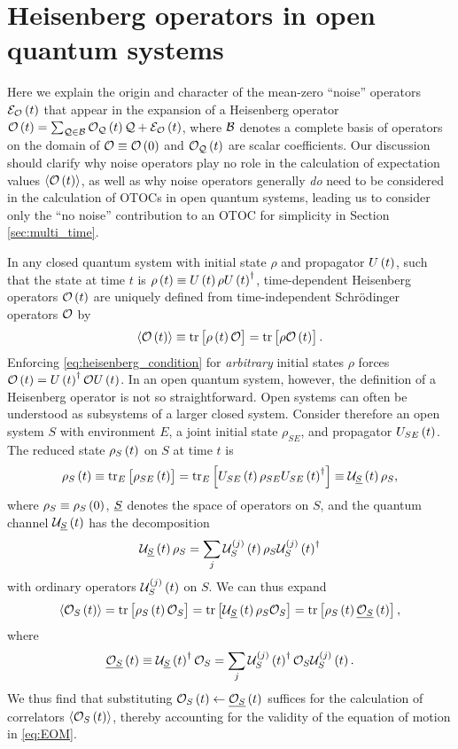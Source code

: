 \section{Heisenberg operators in open quantum systems}
\label{sec:noise}

Here we explain the origin and character of the mean-zero ``noise''
operators $\mathcal{E}_{\mathcal{O}}\left( t \right)$ that appear in the expansion of a Heisenberg
operator $\mathcal{O}\left( t \right)=\sum_{\mathcal{Q}\in\mathcal{B}}\mathcal{O}_{\mathcal{Q}}\left( t \right)\mathcal{Q}+\mathcal{E}_{\mathcal{O}}\left( t \right)$, where $\mathcal{B}$
denotes a complete basis of operators on the domain of
$\mathcal{O}\equiv\mathcal{O}\left( 0 \right)$ and $\mathcal{O}_{\mathcal{Q}}\left( t \right)$ are scalar coefficients.  Our
discussion should clarify why noise operators play no role in the
calculation of expectation values $\braket{\mathcal{O}\left( t \right)}$, as well as why noise
operators generally {\it do} need to be considered in the calculation
of OTOCs in open quantum systems, leading us to consider only the ``no
noise'' contribution to an OTOC for simplicity in Section
\ref{sec:multi_time}.

In any closed quantum system with initial state $\rho$ and propagator
$U\left( t \right)$, such that the state at time $t$ is
$\rho\left( t \right)\equiv U\left( t \right)\rho U\left( t \right)^\dag$, time-dependent Heisenberg
operators $\mathcal{O}\left( t \right)$ are uniquely defined from time-independent
Schr\"odinger operators $\mathcal{O}$ by
\begin{align}
  \braket{\mathcal{O}\left( t \right)} \equiv \tr\left[ \rho\left( t \right)\mathcal{O} \right] = \tr\left[ \rho\mathcal{O}\left( t \right) \right].
  \label{eq:heisenberg_condition}
\end{align}
Enforcing \eqref{eq:heisenberg_condition} for {\it arbitrary} initial
states $\rho$ forces $\mathcal{O}\left( t \right)=U\left( t \right)^\dag\mathcal{O} U\left( t \right)$.  In an open
quantum system, however, the definition of a Heisenberg operator is
not so straightforward.  Open systems can often be understood as
subsystems of a larger closed system.  Consider therefore an open
system $S$ with environment $E$, a joint initial state $\rho_{SE}$,
and propagator $U_{SE}\left( t \right)$.  The reduced state $\rho_S\left( t \right)$ on $S$
at time $t$ is
\begin{align}
  \rho_S\left( t \right)
  \equiv \tr_E\left[ \rho_{SE}\left( t \right) \right]
  = \tr_E\left[ U_{SE}\left( t \right) \rho_{SE} U_{SE}\left( t \right)^\dag \right]
  \equiv \mathcal{U}_{\underline S}\left( t \right) \rho_S,
  \label{eq:state_S}
\end{align}
where $\rho_S\equiv\rho_S\left( 0 \right)$, $\underline S$ denotes the space of
operators on $S$, and the quantum channel $\mathcal{U}_{\underline S}\left( t \right)$ has the
decomposition\cite{rivas2012time}
\begin{align}
  \mathcal{U}_{\underline S}\left( t \right) \rho_S
  = \sum_j \mathcal{U}_S^{(j)}\left( t \right) \rho_S \mathcal{U}_S^{(j)}\left( t \right)^\dag
\end{align}
with ordinary operators $\mathcal{U}_S^{(j)}\left( t \right)$ on $S$.  We can thus expand
\begin{align}
  \braket{\mathcal{O}_S\left( t \right)}
  = \tr\left[ \rho_S\left( t \right)\mathcal{O}_S \right]
  = \tr\left[ \mathcal{U}_{\underline S}\left( t \right) \rho_S \mathcal{O}_S \right]
  = \tr\left[ \rho_S\left( t \right) \underline{\mathcal{O}_S}\left( t \right) \right],
\end{align}
where
\begin{align}
  \underline{\mathcal{O}_S}\left( t \right)
  \equiv \mathcal{U}_{\underline S}\left( t \right)^\dag \mathcal{O}_S
  = \sum_j \mathcal{U}_S^{(j)}\left( t \right)^\dag \mathcal{O}_S \mathcal{U}_S^{(j)}\left( t \right).
  \label{eq:heisenberg_wrong}
\end{align}
We thus find that substituting $\mathcal{O}_S\left( t \right)\leftarrow\underline{\mathcal{O}_S}\left( t \right)$
suffices for the calculation of correlators $\braket{\mathcal{O}_S\left( t \right)}$, thereby
accounting for the validity of the equation of motion in
\eqref{eq:EOM}.

